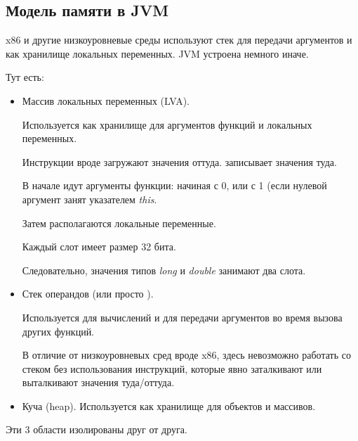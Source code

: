 \subsection{Модель памяти в \ac{JVM}}


x86 и другие низкоуровневые среды используют стек для передачи аргументов и как
хранилище локальных переменных.
\ac{JVM} устроена немного иначе.

Тут есть:

\begin{itemize}
\item Массив локальных переменных (\ac{LVA}).

Используется как хранилище для аргументов функций и локальных переменных.

Инструкции вроде  загружают значения оттуда.
 записывает значения туда.

В начале идут аргументы функции: начиная с 0, или с 1 
(если нулевой аргумент занят указателем \emph{this}.

Затем располагаются локальные переменные.


Каждый слот имеет размер 32 бита.

Следовательно, значения типов \emph{long} и \emph{double} занимают два слота.

\item Стек операндов (или просто ).

Используется для вычислений и для передачи аргументов во время вызова других функций.

В отличие от низкоуровневых сред вроде x86, здесь невозможно работать со стеком
без использования инструкций, которые явно заталкивают или выталкивают значения туда/оттуда.

\item 
Куча (heap). Используется как хранилище для объектов и массивов.
\end{itemize}


Эти 3 области изолированы друг от друга.
